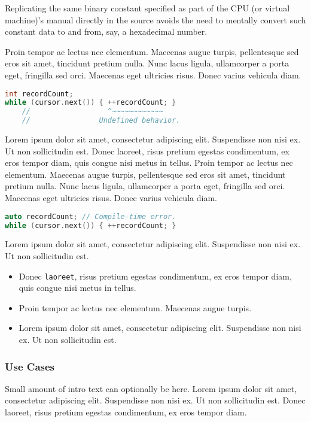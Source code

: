 \documentclass[twoside,10pt,letterpaper,usenames]{newstyle-PearsonGeneric-7-38}
\begin{document}
Replicating the same binary constant specified as part of the CPU (or
virtual machine)'s manual directly in the source avoids the need to
mentally convert such constant data to and from, say, a hexadecimal
number.

Proin tempor ac lectus nec elementum. Maecenas augue turpis,
pellentesque sed eros sit amet, tincidunt pretium nulla. Nunc lacus
ligula, ullamcorper a porta eget, fringilla sed orci. Maecenas eget
ultricies risus. Donec varius vehicula diam.

\begin{lstlisting}[language=C++]
int recordCount;
while (cursor.next()) { ++recordCount; }
    //                  ^~~~~~~~~~~~~
    //                Undefined behavior.
\end{lstlisting}

Lorem ipsum dolor sit amet, consectetur adipiscing elit. Suspendisse non
nisi ex. Ut non sollicitudin est. Donec laoreet, risus pretium egestas
condimentum, ex eros tempor diam, quis congue nisi metus in tellus.
Proin tempor ac lectus nec elementum. Maecenas augue turpis,
pellentesque sed eros sit amet, tincidunt pretium nulla. Nunc lacus
ligula, ullamcorper a porta eget, fringilla sed orci. Maecenas eget
ultricies risus. Donec varius vehicula diam.

\begin{lstlisting}[language=C++]
auto recordCount; // Compile-time error.
while (cursor.next()) { ++recordCount; }
\end{lstlisting}
    

Lorem ipsum dolor sit amet, consectetur adipiscing elit. Suspendisse non
nisi ex. Ut non sollicitudin est.

\begin{itemize}
\item{Donec \texttt{laoreet}, risus pretium egestas condimentum, ex eros tempor diam, quis congue nisi metus in tellus.}
\item{Proin tempor ac lectus nec elementum. Maecenas augue turpis.}
\item{Lorem ipsum dolor sit amet, consectetur adipiscing elit. Suspendisse non nisi ex. Ut non sollicitudin est.}
\end{itemize}

\subsubsection[Use Cases]{Use Cases}\label{use-cases}

Small amount of intro text can optionally be here. Lorem ipsum dolor sit
amet, consectetur adipiscing elit. Suspendisse non nisi ex. Ut non
sollicitudin est. Donec laoreet, risus pretium egestas condimentum, ex
eros tempor diam.
\end{document}
